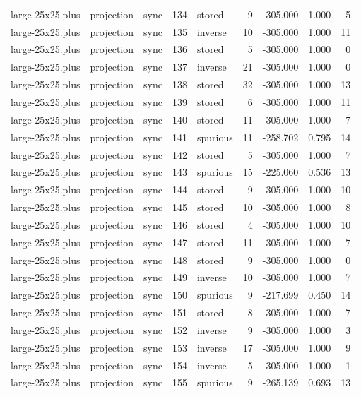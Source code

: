 \begin{tabular}{lllrlrrrr}
large-25x25.plus & projection & sync & 134 & stored & 9 & -305.000 & 1.000 & 5 \\
large-25x25.plus & projection & sync & 135 & inverse & 10 & -305.000 & 1.000 & 11 \\
large-25x25.plus & projection & sync & 136 & stored & 5 & -305.000 & 1.000 & 0 \\
large-25x25.plus & projection & sync & 137 & inverse & 21 & -305.000 & 1.000 & 0 \\
large-25x25.plus & projection & sync & 138 & stored & 32 & -305.000 & 1.000 & 13 \\
large-25x25.plus & projection & sync & 139 & stored & 6 & -305.000 & 1.000 & 11 \\
large-25x25.plus & projection & sync & 140 & stored & 11 & -305.000 & 1.000 & 7 \\
large-25x25.plus & projection & sync & 141 & spurious & 11 & -258.702 & 0.795 & 14 \\
large-25x25.plus & projection & sync & 142 & stored & 5 & -305.000 & 1.000 & 7 \\
large-25x25.plus & projection & sync & 143 & spurious & 15 & -225.060 & 0.536 & 13 \\
large-25x25.plus & projection & sync & 144 & stored & 9 & -305.000 & 1.000 & 10 \\
large-25x25.plus & projection & sync & 145 & stored & 10 & -305.000 & 1.000 & 8 \\
large-25x25.plus & projection & sync & 146 & stored & 4 & -305.000 & 1.000 & 10 \\
large-25x25.plus & projection & sync & 147 & stored & 11 & -305.000 & 1.000 & 7 \\
large-25x25.plus & projection & sync & 148 & stored & 9 & -305.000 & 1.000 & 0 \\
large-25x25.plus & projection & sync & 149 & inverse & 10 & -305.000 & 1.000 & 7 \\
large-25x25.plus & projection & sync & 150 & spurious & 9 & -217.699 & 0.450 & 14 \\
large-25x25.plus & projection & sync & 151 & stored & 8 & -305.000 & 1.000 & 7 \\
large-25x25.plus & projection & sync & 152 & inverse & 9 & -305.000 & 1.000 & 3 \\
large-25x25.plus & projection & sync & 153 & inverse & 17 & -305.000 & 1.000 & 9 \\
large-25x25.plus & projection & sync & 154 & inverse & 5 & -305.000 & 1.000 & 1 \\
large-25x25.plus & projection & sync & 155 & spurious & 9 & -265.139 & 0.693 & 13 \\

\end{tabular}

